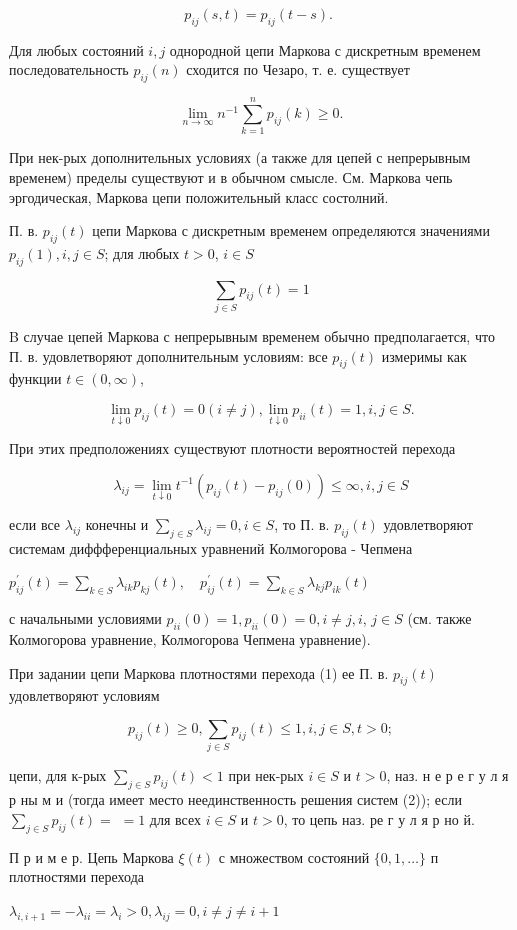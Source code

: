 \documentclass[10pt]{article}
\begin{document}
\[
p_{i j}(s, t)=p_{i j}(t-s) \text {. }
\]

Для любых состояний $i, j$ однородной цепи Маркова с дискретным временем последовательность $p_{i j}(n)$ сходится по Чезаро, т. е. существует

\[
\lim _{n \rightarrow \infty} n^{-1} \sum_{k=1}^{n} p_{i j}(k) \geqslant 0 .
\]

При нек-рых дополнительных условиях (а также для цепей с непрерывным временем) пределы существуют и в обычном смысле. См. Маркова чепь эргодическая, Маркова цепи положительный класс состолний.

П. в. $p_{i j}(t)$ цепи Маркова с дискретным временем определяются значениями $p_{i j}(1), i, j \in S$; для любых $t>0$, $i \in S$

\[
\sum_{j \in S} p_{i j}(t)=1
\]

B случае цепей Маркова с непрерывным временем обычно предполагается, что П. в. удовлетворяют дополнительным условиям: все $p_{i j}(t)$ измеримы как функции $t \in(0, \infty)$,

\[
\lim _{t \downarrow 0} p_{i j}(t)=0(i \neq j), \lim _{t \downarrow 0} p_{i i}(t)=1, i, j \in S .
\]

При этих предположениях существуют плотности вероятностей перехода

\[
\lambda_{i j}=\lim _{t \downarrow 0} t^{-1}\left(p_{i j}(t)-p_{i j}(0)\right) \leqslant \infty, i, j \in S
\]

если все $\lambda_{i j}$ конечны и $\sum_{j \in S} \lambda_{i j}=0, i \in S$, то П. в. $p_{i j}(t)$ удовлетворяют системам диффференциальных уравнений Колмогорова - Чепмена

$p_{i j}^{\prime}(t)=\sum_{k \in S} \lambda_{i k} p_{k j}(t), \quad p_{i j}^{\prime}(t)=\sum_{k \in S} \lambda_{k j} p_{i k}(t)$

с начальными условиями $p_{i i}(0)=1, p_{i i}(0)=0, i \neq j, i$, $j \in S$ (см. также Колмогорова уравнение, Колмогорова Чепмена уравнение).

При задании цепи Маркова плотностями перехода (1) ее П. в. $p_{i j}(t)$ удовлетворяют условиям

\[
p_{i j}(t) \geqslant 0, \sum_{j \in S} p_{i j}(t) \leqslant 1, i, j \in S, t>0 ;
\]

цепи, для к-рых $\sum_{j \in S} p_{i j}(t)<1$ при нек-рых $i \in S$ и $t>0$, наз. н е р е г у л я р ны м и (тогда имеет место неединственность решения систем (2)); если $\sum_{j \in S} p_{i j}(t)=$ $=1$ для всех $i \in S$ и $t>0$, то цепь наз. ре г у л я р но й.

П р и м е р. Цепь Маркова $\xi(t)$ с множеством состояний $\{0,1, \ldots\}$ п плотностями перехода

$\lambda_{i, i+1}=-\lambda_{i i}=\lambda_{i}>0, \lambda_{i j}=0, i \neq j \neq i+1$
\end{document}
